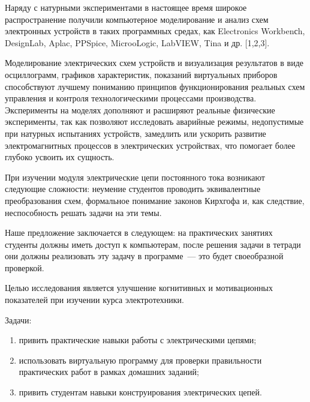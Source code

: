  

\makeProcTitle
{}

Наряду с натурными экспериментами в настоящее время широкое распространение получили компьютерное моделирование и анализ схем электронных устройств в таких программных средах, как Electronics Workbenсh, DesignLab, Aplac, PPSpice, MicrooLogic, LabVIEW, Tina и др. [1,2,3].

Моделирование электрических схем устройств и визуализация результатов в виде осциллограмм, графиков характеристик, показаний виртуальных приборов способствуют лучшему пониманию принципов функционирования реальных схем управления и контроля технологическими процессами производства. Эксперименты на моделях дополняют и расширяют реальные физические эксперименты, так как позволяют исследовать аварийные режимы, недопустимые при натурных испытаниях устройств, замедлить или ускорить развитие электромагнитных процессов в электрических устройствах, что помогает более глубоко усвоить их сущность.

При изучении модуля электрические цепи постоянного тока возникают следующие сложности: неумение студентов проводить эквивалентные преобразования схем, формальное понимание законов Кирхгофа и, как следствие, неспособность решать задачи на эти темы.

Наше предложение заключается в следующем: на практических занятиях студенты должны иметь доступ к компьютерам, после решения задачи в тетради они должны реализовать эту задачу в программе~--- это будет своеобразной проверкой.

Целью исследования является улучшение когнитивных и мотивационных показателей при изучении курса электротехники.

Задачи:

\begin{enumerate}[noitemsep]\vspace{-8pt}
    \item привить практические навыки работы с электрическими цепями;
    \item использовать виртуальную программу для проверки правильности
    практических работ в рамках домашних заданий;
    \item привить студентам навыки конструирования электрических цепей.
\end{enumerate}
 \vspace{-8pt}

